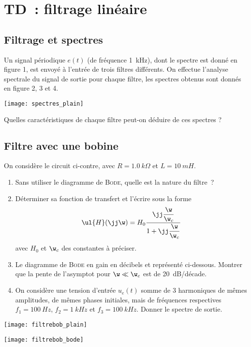 \documentclass[a4paper, 12pt, final, garamond]{book}
\begin{document}
\setcounter{chapter}{6}

\chapter{TD~: filtrage lin\'eaire}

\section{Filtrage et spectres}

Un signal périodique $e(t)$ (de fréquence \SI{1}{kHz}), dont le spectre est
donné en figure 1, est envoyé à l'entrée de trois filtres différents. On
effectue l'analyse spectrale du signal de sortie pour chaque filtre, les
spectres obtenus sont donnés en figure 2, 3 et 4.

\begin{center}
    \texttt{[image: spectres\_plain]}
\end{center}

Quelles caractéristiques de chaque filtre peut-on déduire de ces spectres ?

\section{Filtre avec une bobine}
On considère le circuit ci-contre, avec $R = \SI{1.0}{k\Omega}$ et $L =
\SI{10}{mH}$.

\begin{minipage}{0.60\linewidth}
    \begin{enumerate}
        \item Sans utiliser le diagramme de \textsc{Bode}, quelle est la nature
            du filtre~?
        \item Déterminer sa fonction de transfert et l'écrire sous la forme
            \[\ul{H}(\jj\w) = H_0 \frac{\jj\dfrac{\w}{\w_c}}{1 +
            \jj\dfrac{\w}{\w_c}}\]
            avec $H_0$ et $\w_c$ des constantes à préciser.
        \item Le diagramme de \textsc{Bode} en gain en décibels et représenté
            ci-dessous. Montrer que la pente de l'asymptot pour $\w \ll \w_c$ est de
            \SI{20}{dB/décade}.
        \item On considère une tension d'entrée $u_e(t)$ somme de 3 harmoniques de
            mêmes amplitudes, de mêmes phases initiales, mais de fréquences
            respectives $f_1 = \SI{100}{Hz}$, $f_2 = \SI{1}{kHz}$ et $f_3 =
            \SI{100}{kHz}$. Donner le spectre de sortie.
    \end{enumerate}
\end{minipage}
\hfill
\begin{minipage}{0.35\linewidth}
    \begin{center}
        \hspace{10pt}\texttt{[image: filtrebob\_plain]}
    \end{center}
    \begin{center}
        \texttt{[image: filtrebob\_bode]}
    \end{center}
\end{minipage}
\end{document}
